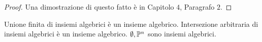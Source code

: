             \begin{proof}
                Una dimostrazione di questo fatto è in \cite{fulton} Capitolo $4$, Paragrafo $2$.
            \begin{comment}
                Sia $I \ideal k[X_1,\ldots,X_{n+1}]$ omogeneo, e siano $F^1,\ldots,F^r$ polinomi che generano $I$, allora, se per ogni $1 \leq i \leq 
                r, d_i$ è il grado di $F^i$ e $F^i = \sum_{i=0}^{d_i} F_j^i$ con $F_j^i$ polinomio omogeneo di grado $j$, allora, $I = (F_j^i : j \in 
                \{0,\ldots,d_i\}, i \in \{1,\ldots,r\})$. \\
                Viceversa, siano $(F^\alpha)_{\alpha \in A}$, con $A$ insieme finito, dei generatori omogenei per $I$. Sia $F \in I$, e sia $F = 
                \sum_{i=m}^d F_i, F_i$ omogeneo di grado $i$. Siccome $F \in I$, esistono $B^{\alpha} \in k[X_1,\ldots,X_{n+1}]$ tali che $F = 
                \sum_{\alpha \in A} B^{\alpha}F^{\alpha}$. \\
                Denoto ora con $B_i^{\alpha}$ il monomio di grado $i$ del polinomio $B^{\alpha}$, e con $d_{\alpha}$ il grado del polinomio $F^{\alpha}$.\\
                Uguagliando i gradi segue che $F_m = \sum_{\alpha \in A} B_{m-d_{\alpha}}^{\alpha}F^{\alpha}$, da cui $F_m \in I$.\\
                Ne segue inoltre che $G = F - F_m \in I$ ed applicando lo stesso argomento a $G$, segue che $F_{m+1} \in I$. Per induzione si conclude.  
            \end{comment}
        \end{proof}
        \begin{proposizione}\label{prop:alg=clo}
            Unione finita di insiemi algebrici è un insieme algebrico. Intersezione arbitraria di insiemi algebrici è un insieme algebrico. $\emptyset,\P^n$ 
            sono insiemi algebrici.
        \end{proposizione}
